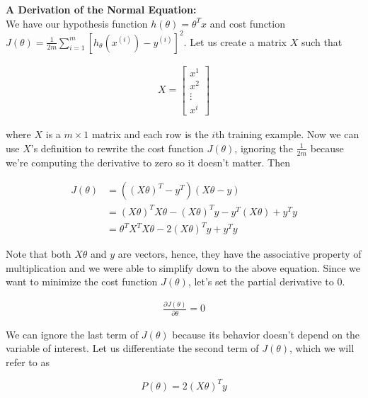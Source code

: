 \documentclass{article}
\begin{document}
        \noindent \textbf{A Derivation of the Normal Equation:} \\
        We have our hypothesis function $h(\theta)=\theta^T x$ and cost function $J(\theta)=\frac{1}{2m}
        \sum^m_{i=1}[h_\theta (x^{(i)})-y^{(i)}]^2$. Let us create a matrix $X$ such that

        \begin{align*}
            X =
            \begin{bmatrix}
                x^1 \\
                x^2 \\
                \vdots \\
                x^i
            \end{bmatrix}
        \end{align*}

        \noindent where $X$ is a $m\times 1$ matrix and each row is the $i$th training example. Now we can use
        $X$'s definition to rewrite the cost function $J(\theta)$, ignoring the $\frac{1}{2m}$ because we're
        computing the derivative to zero so it doesn't matter. Then

        \begin{align*}
            J(\theta) &= ((X\theta)^T-y^T)(X\theta-y) \\
            &= (X\theta)^T X\theta - (X\theta)^T y - y^T(X\theta) + y^T y \\
            &= \theta^T X^T X\theta-2(X\theta)^T y+y^T y
        \end{align*}

        \noindent Note that both $X\theta$ and $y$ are vectors, hence, they have the associative property of
        multiplication and we were able to simplify down to the above equation. Since we want to minimize the
        cost function $J(\theta)$, let's set the partial derivative to 0.

        \begin{align*}
            \frac{\partial J(\theta)}{\partial\theta}  = 0
        \end{align*}

        \noindent We can ignore the last term of $J(\theta)$ because its behavior doesn't depend on the variable
        of interest. Let us differentiate the second term of $J(\theta)$, which we will refer to as

        \begin{equation*}
            P(\theta) = 2(X\theta)^T y
        \end{equation*}
\end{document}
